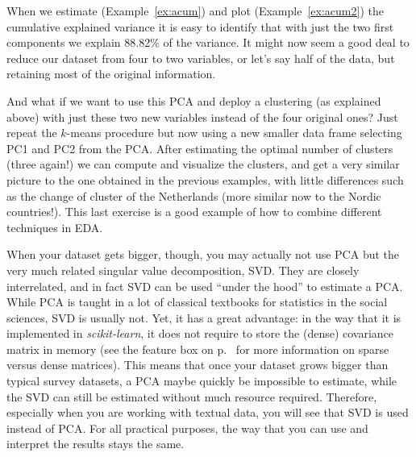 
When we estimate (Example~\ref{ex:acum}) and plot (Example~\ref{ex:acum2}) the cumulative explained variance it is easy to identify that with just the two first components we explain 88.82\% of the variance. It might now seem a good deal to reduce our dataset from four to two variables, or let’s say half of the data, but retaining most of the original information.


And what if we want to use this PCA and deploy a clustering (as explained above) with just these two new variables instead of the four original ones?  Just repeat the $k$-means procedure but now using a new smaller data frame selecting PC1 and PC2 from the PCA. After estimating the optimal number of clusters (three again!) we can compute and visualize the clusters, and get a very similar picture to the one obtained in the previous examples, with little differences such as the change of cluster of the Netherlands (more similar now to the Nordic countries!). This last exercise is a good example of how to combine different techniques in EDA.


When your dataset gets bigger, though, you may actually not use PCA
but the very much related singular value decomposition, SVD. They are
closely interrelated, and in fact SVD can be used ``under the hood''
to estimate a PCA. While PCA is taught in a lot of classical textbooks
for statistics in the social sciences, SVD is usually not. Yet, it has
a great advantage: in the way that it is implemented in
\emph{scikit-learn}, it does not require to store the (dense)
covariance matrix in memory (see the feature box
on p.~\pageref{feature:sparse} for more information on sparse versus dense
matrices). This means that once  your dataset grows bigger than
typical survey datasets, a PCA maybe quickly be impossible to estimate,
while the SVD can still be estimated without much resource
required. Therefore, especially when you are working with textual data,
you will see that SVD is used instead of PCA. For all practical
purposes, the way that  you can use and interpret the results stays the
same.

